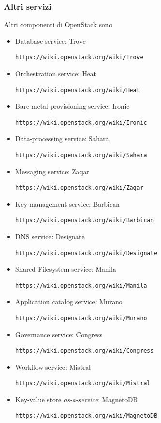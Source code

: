 \documentclass[../main.tex]{subfiles}
\begin{document}
\subsubsection{Altri servizi}
Altri componenti di OpenStack sono
\begin{itemize}
\item{Database service: Trove}
\begin{Verbatim}[frame=single]
https://wiki.openstack.org/wiki/Trove
\end{Verbatim}
\item{Orchestration service: Heat}
\begin{Verbatim}[frame=single]
https://wiki.openstack.org/wiki/Heat
\end{Verbatim}
\item{Bare-metal provisioning service: Ironic}
\begin{Verbatim}[frame=single]
https://wiki.openstack.org/wiki/Ironic
\end{Verbatim}
\item{Data-processing service: Sahara}
\begin{Verbatim}[frame=single]
https://wiki.openstack.org/wiki/Sahara
\end{Verbatim}
\item{Messaging service: Zaqar}
\begin{Verbatim}[frame=single]
https://wiki.openstack.org/wiki/Zaqar
\end{Verbatim}
\item{Key management service: Barbican}
\begin{Verbatim}[frame=single]
https://wiki.openstack.org/wiki/Barbican
\end{Verbatim}
\item{DNS service: Designate}
\begin{Verbatim}[frame=single]
https://wiki.openstack.org/wiki/Designate
\end{Verbatim}
\item{Shared Filesystem service: Manila}
\begin{Verbatim}[frame=single]
https://wiki.openstack.org/wiki/Manila
\end{Verbatim}
\item{Application catalog service: Murano}
\begin{Verbatim}[frame=single]
https://wiki.openstack.org/wiki/Murano
\end{Verbatim}
\item{Governance service: Congress}
\begin{Verbatim}[frame=single]
https://wiki.openstack.org/wiki/Congress
\end{Verbatim}
\item{Workflow service: Mistral}
\begin{Verbatim}[frame=single]
https://wiki.openstack.org/wiki/Mistral
\end{Verbatim}
\item{Key-value store \textit{as-a-service}: MagnetoDB}
\begin{Verbatim}[frame=single]
https://wiki.openstack.org/wiki/MagnetoDB
\end{Verbatim}
\end{itemize}
\end{document}

